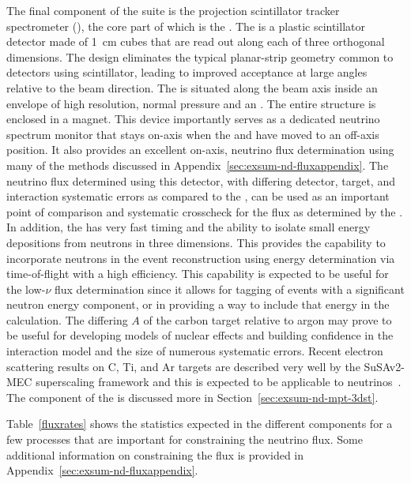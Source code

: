 The final component of the   suite is the \threed projection scintillator tracker spectrometer (),  the core part of which is the .  The  is a plastic scintillator detector made of \SI{1}{cm} cubes that are read out along each of three orthogonal dimensions.  The design eliminates the typical planar-strip geometry common to detectors using scintillator, leading to improved acceptance at large angles relative to the beam direction.  The  is situated along the beam axis inside an envelope of high resolution, normal pressure  and an .  The entire structure is enclosed in a magnet. This device importantly serves as a dedicated  neutrino spectrum monitor that stays on-axis when the    and  have moved to an off-axis position. 
It also provides an excellent on-axis, neutrino flux determination using many of the methods discussed in Appendix~\ref{sec:exsum-nd-fluxappendix}.  The neutrino flux determined using this detector, with  differing detector, target, and interaction systematic errors as compared to the , can be used as an important point of comparison and systematic crosscheck for the flux as determined by the .
In addition, the  has very fast timing and the ability to isolate small energy depositions from neutrons in three dimensions.  This provides the capability to  incorporate neutrons in the event reconstruction using energy determination via time-of-flight with a high efficiency. This capability is expected to be useful for the low-$\nu$ flux determination since it allows for tagging of events with a significant neutron energy component, or in providing a way to include that energy in the calculation.
The differing $A$ of the carbon target relative to argon may prove to be useful for developing models of nuclear effects and building confidence in the interaction model and the size of numerous systematic errors.  Recent electron scattering results on C, Ti, and Ar targets are described very well by the SuSAv2-MEC superscaling framework and this is expected to be applicable to neutrinos~\cite{Barbaro:2019vsr}.  The  component of the  is discussed more in Section~\ref{sec:exsum-nd-mpt-3dst}.

Table~\ref{fluxrates} shows the statistics expected in the different  components for a few processes that are important for constraining the neutrino flux.  Some additional information on constraining the flux is provided in Appendix~\ref{sec:exsum-nd-fluxappendix}.

